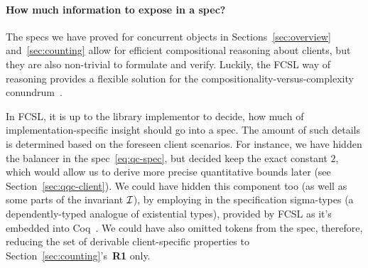 

\paragraph{How much information to expose in a spec?}
\label{sec:how-much-information}

The specs we have proved for concurrent objects in
Sections~\ref{sec:overview} and~\ref{sec:counting} allow for efficient
compositional reasoning about clients, but they are also non-trivial
to formulate and verify. Luckily, the FCSL way of reasoning provides a
flexible solution for the compositionality-versus-complexity
conundrum~\cite[\S 7]{Lamport:COMPOS97}.

In FCSL, it is up to the library implementor to decide, how much of
implementation-specific insight should go into a spec. The amount of
such details is determined based on the foreseen client scenarios. For
instance, we have hidden the balancer in the spec~\eqref{eq:qc-spec},
but decided keep the exact constant $2$, which would allow us to
derive more precise quantitative bounds later (see
Section~\ref{sec:qqc-client}). We could have hidden this component too
(as well as some parts of the invariant $\mathcal{I}$), by employing in the
specification sigma-types (a dependently-typed analogue of existential
types), provided by FCSL as it's embedded into
Coq~\cite{Coq-manual}. We could have also omitted tokens from the
spec, therefore, reducing the set of derivable client-specific
properties to Section~\ref{sec:counting}'s~\textbf{R1} only.


